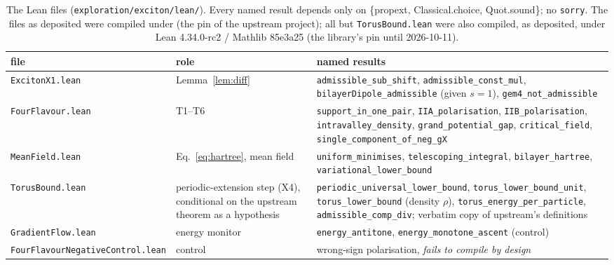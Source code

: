 \documentclass[11pt,a4paper]{article}
\begin{document}
\begin{table}[ht]\centering\small
\begin{tabular}{@{}p{3.5cm}p{3.7cm}p{8.0cm}@{}}
\toprule
file & role & named results\\
\midrule
\texttt{ExcitonX1.lean} & Lemma~\ref{lem:diff} & \texttt{admissible\_\allowbreak sub\_\allowbreak shift}, \texttt{admissible\_\allowbreak const\_\allowbreak mul}, \texttt{bilayerDipole\_\allowbreak admissible} (given $s=1$), \texttt{gem4\_\allowbreak not\_\allowbreak admissible}\\
\texttt{FourFlavour.lean} & T1--T6 & \texttt{support\_\allowbreak in\_\allowbreak one\_\allowbreak pair}, \texttt{IIA\_\allowbreak polarisation}, \texttt{IIB\_\allowbreak polarisation}, \texttt{intravalley\_\allowbreak density}, \texttt{grand\_\allowbreak potential\_\allowbreak gap}, \texttt{critical\_\allowbreak field}, \texttt{single\_\allowbreak component\_\allowbreak of\_\allowbreak neg\_\allowbreak gX}\\
\texttt{MeanField.lean} & Eq.~\eqref{eq:hartree}, mean field & \texttt{uniform\_\allowbreak minimises}, \texttt{telescoping\_\allowbreak integral}, \texttt{bilayer\_\allowbreak hartree}, \texttt{variational\_\allowbreak lower\_\allowbreak bound}\\
\texttt{TorusBound.lean} & periodic-extension step (X4), conditional on the upstream theorem as a hypothesis & \texttt{periodic\_\allowbreak universal\_\allowbreak lower\_\allowbreak bound}, \texttt{torus\_\allowbreak lower\_\allowbreak bound\_\allowbreak unit}, \texttt{torus\_\allowbreak lower\_\allowbreak bound} (density $\rho$), \texttt{torus\_\allowbreak energy\_\allowbreak per\_\allowbreak particle}, \texttt{admissible\_\allowbreak comp\_\allowbreak div}; verbatim copy of upstream's definitions\\
\texttt{GradientFlow.lean} & energy monitor & \texttt{energy\_\allowbreak antitone}, \texttt{energy\_\allowbreak monotone\_\allowbreak ascent} (control)\\
\texttt{FourFlavourNegative\allowbreak Control.lean} & control & wrong-sign polarisation, \emph{fails to compile by design}\\
\bottomrule
\end{tabular}
\caption{The Lean files (\texttt{exploration/exciton/lean/}). Every named result depends only on
\{propext, Classical.choice, Quot.sound\}; no \texttt{sorry}. The files as deposited were compiled under \LEANNEW{} (the pin of the upstream project); all but \texttt{TorusBound.lean} were also
compiled, as deposited, under Lean 4.34.0-rc2 / Mathlib 85e3a25 (the library's pin until 2026-10-11).}
\end{table}
\end{document}
